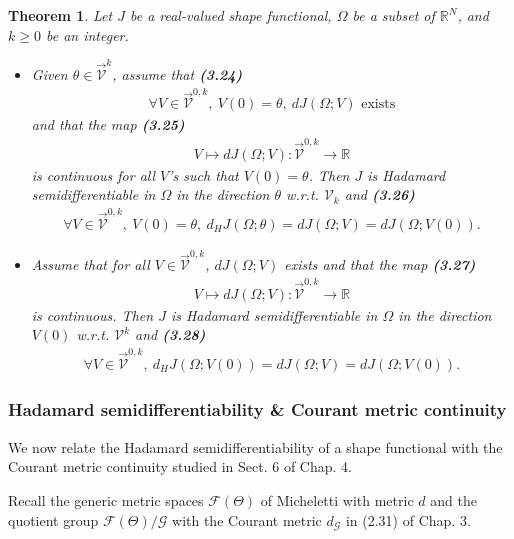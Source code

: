 \documentclass[oneside]{book}
\numberwithin{equation}{section}
\newtheorem{theorem}{Theorem}[section]
\begin{document}
\begin{theorem}
    Let $J$ be a real-valued shape functional, $\Omega$ be a subset of $\mathbb{R}^N$, and $k\ge 0$ be an integer.
    \begin{itemize}
        \item[(i)] Given $\theta\in\vec{\mathcal{V}}^k$, assume that \textbf{(3.24)}
        \begin{align*}
            \forall V\in\vec{\mathcal{V}}^{0,k},\ V(0) = \theta,\ dJ(\Omega;V) \mbox{ exists}
        \end{align*}
        and that the map \textbf{(3.25)}
        \begin{align*}
            V\mapsto dJ(\Omega;V):\vec{\mathcal{V}}^{0,k}\to\mathbb{R}
        \end{align*}
        is continuous for all $V$'s such that $V(0) = \theta$. Then $J$ is Hadamard semidifferentiable in $\Omega$ in the direction $\theta$ w.r.t. $\mathcal{V}_k$ and \textbf{(3.26)}
        \begin{align*}
            \forall V\in\vec{\mathcal{V}}^{0,k},\ V(0) = \theta,\ d_HJ(\Omega;\theta) = dJ(\Omega;V) = dJ(\Omega;V(0)).
        \end{align*}
        \item[(ii)] Assume that for all $V\in\vec{\mathcal{V}}^{0,k}$, $dJ(\Omega;V)$ exists and that the map \textbf{(3.27)}
        \begin{align*}
            V\mapsto dJ(\Omega;V):\vec{\mathcal{V}}^{0,k}\to\mathbb{R}
        \end{align*}
        is continuous. Then $J$ is Hadamard semidifferentiable in $\Omega$ in the direction $V(0)$ w.r.t. $\mathcal{V}^k$ and \textbf{(3.28)}
        \begin{align*}
            \forall V\in\vec{\mathcal{V}}^{0,k},\ d_HJ(\Omega;V(0)) = dJ(\Omega;V) = dJ(\Omega;V(0)).
        \end{align*}
    \end{itemize}
\end{theorem}

\subsubsection{Hadamard semidifferentiability \& Courant metric continuity}
We now relate the Hadamard semidifferentiability of a shape functional with the Courant metric continuity studied in Sect. 6 of Chap. 4.

Recall the generic metric spaces $\mathcal{F}(\Theta)$ of Micheletti with metric $d$ and the quotient group $\mathcal{F}(\Theta)/\mathcal{G}$ with the Courant metric $d_\mathcal{G}$ in (2.31) of Chap. 3.
\end{document}
